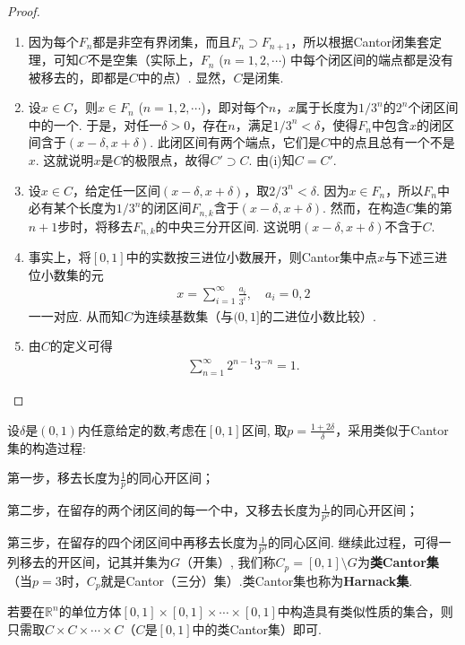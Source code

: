 \documentclass[../../main.tex]{subfiles}%
\begin{document}
\begin{proof}
\begin{enumerate}[(1)]
\item 因为每个$F_n$都是非空有界闭集，而且$F_n\supset F_{n + 1}$，所以根据Cantor闭集套定理，可知$C$不是空集（实际上，$F_n$ ($n = 1,2,\cdots$) 中每个闭区间的端点都是没有被移去的，即都是$C$中的点）. 显然，$C$是闭集.

\item 设$x\in C$，则$x\in F_n$ ($n = 1,2,\cdots$)，即对每个$n$，$x$属于长度为$1/3^n$的$2^n$个闭区间中的一个. 于是，对任一$\delta>0$，存在$n$，满足$1/3^n<\delta$，使得$F_n$中包含$x$的闭区间含于$(x - \delta, x + \delta)$. 此闭区间有两个端点，它们是$C$中的点且总有一个不是$x$. 这就说明$x$是$C$的极限点，故得$C'\supset C$. 由(i)知$C = C'$.

\item 设$x\in C$，给定任一区间$(x - \delta, x + \delta)$，取$2/3^n<\delta$. 因为$x\in F_n$，所以$F_n$中必有某个长度为$1/3^n$的闭区间$F_{n,k}$含于$(x - \delta, x + \delta)$. 然而，在构造$C$集的第$n + 1$步时，将移去$F_{n,k}$的中央三分开区间. 这说明$(x - \delta, x + \delta)$不含于$C$.

\item 事实上，将$[0,1]$中的实数按三进位小数展开，则Cantor集中点$x$与下述三进位小数集的元
\begin{align*}
x=\sum_{i = 1}^{\infty}\frac{a_i}{3^i}, \quad a_i = 0,2
\end{align*}
一一对应. 从而知$C$为连续基数集（与$(0,1]$的二进位小数比较）. 

\item 由$C$的定义可得
\begin{align*}
\sum_{n = 1}^{\infty}2^{n - 1}3^{-n}=1.
\end{align*}
\end{enumerate}
\end{proof}

\begin{definition}[类Cantor集]
设$\delta$是$(0,1)$内任意给定的数,考虑在$[0,1]$区间, 取$p=\frac{1+2\delta}{\delta}$，采用类似于Cantor集的构造过程:

第一步，移去长度为$\frac{1}{p}$的同心开区间；

第二步，在留存的两个闭区间的每一个中，又移去长度为$\frac{1}{p^2}$的同心开区间；

第三步，在留存的四个闭区间中再移去长度为$\frac{1}{p^3}$的同心区间. 继续此过程，可得一列移去的开区间，记其并集为$G$（开集）,
我们称$C_p=[0,1]\setminus G$为\textbf{类Cantor集}（当$p = 3$时，$C_p$就是Cantor（三分）集）.类Cantor集也称为\textbf{Harnack集}. 
\end{definition}
\begin{remark}
若要在$\mathbb{R}^n$的单位方体$[0,1]\times[0,1]\times\cdots\times[0,1]$中构造具有类似性质的集合，则只需取$C\times C\times\cdots\times C$（$C$是$[0,1]$中的类Cantor集）即可.
\end{remark}
\end{document}
